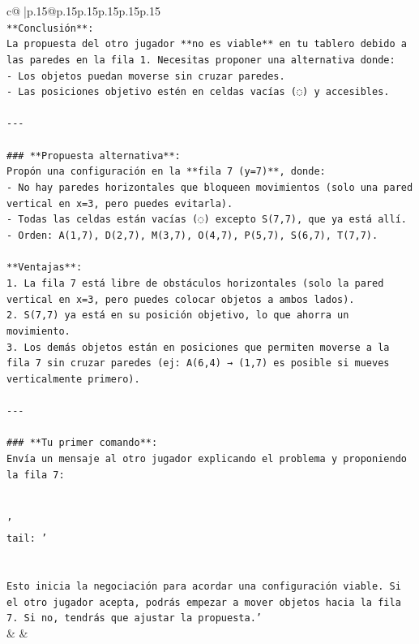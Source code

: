 \documentclass{article}
\begin{document}
{\begin{supertabular}{c@{$\;$}|p{.15\linewidth}@{}p{.15\linewidth}p{.15\linewidth}p{.15\linewidth}p{.15\linewidth}p{.15\linewidth}}
{{{\\ 
\texttt{**Conclusión**:} \\
\texttt{La propuesta del otro jugador **no es viable** en tu tablero debido a las paredes en la fila 1. Necesitas proponer una alternativa donde:} \\
\texttt{{-} Los objetos puedan moverse sin cruzar paredes.} \\
\texttt{{-} Las posiciones objetivo estén en celdas vacías (◌) y accesibles.} \\
\\ 
\texttt{{-}{-}{-}} \\
\\ 
\texttt{\#\#\# **Propuesta alternativa**:} \\
\texttt{Propón una configuración en la **fila 7 (y=7)**, donde:} \\
\texttt{{-} No hay paredes horizontales que bloqueen movimientos (solo una pared vertical en x=3, pero puedes evitarla).} \\
\texttt{{-} Todas las celdas están vacías (◌) excepto S(7,7), que ya está allí.} \\
\texttt{{-} Orden: A(1,7), D(2,7), M(3,7), O(4,7), P(5,7), S(6,7), T(7,7).} \\
\\ 
\texttt{**Ventajas**:} \\
\texttt{1. La fila 7 está libre de obstáculos horizontales (solo la pared vertical en x=3, pero puedes colocar objetos a ambos lados).} \\
\texttt{2. S(7,7) ya está en su posición objetivo, lo que ahorra un movimiento.} \\
\texttt{3. Los demás objetos están en posiciones que permiten moverse a la fila 7 sin cruzar paredes (ej: A(6,4) → (1,7) es posible si mueves verticalmente primero).} \\
\\ 
\texttt{{-}{-}{-}} \\
\\ 
\texttt{\#\#\# **Tu primer comando**:} \\
\texttt{Envía un mensaje al otro jugador explicando el problema y proponiendo la fila 7:} \\
\\ 
\\ 
\texttt{'} \\
\texttt{tail: '} \\
\\ 
\\ 
\texttt{Esto inicia la negociación para acordar una configuración viable. Si el otro jugador acepta, podrás empezar a mover objetos hacia la fila 7. Si no, tendrás que ajustar la propuesta.'} \\
            }
        }
    }
    & & \\ \\


\end{supertabular}}
\end{document}
